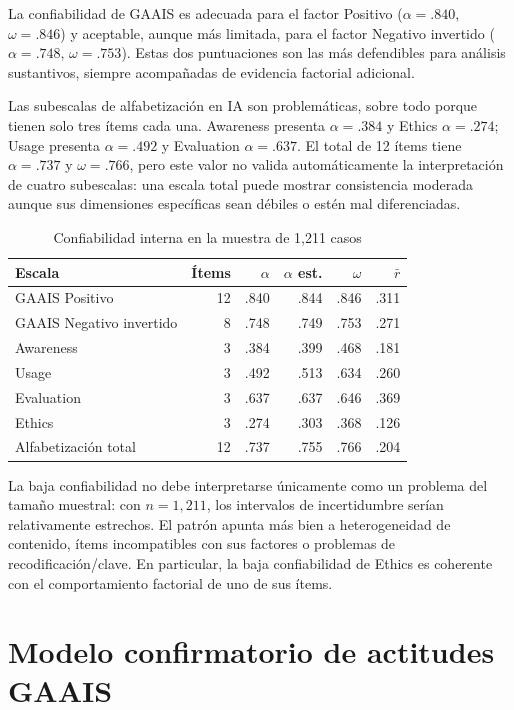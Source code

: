 \documentclass[11pt,a4paper]{article}
\begin{document}
La confiabilidad de GAAIS es adecuada para el factor Positivo ($\alpha=.840$, $\omega=.846$) y aceptable, aunque más limitada, para el factor Negativo invertido ($\alpha=.748$, $\omega=.753$). Estas dos puntuaciones son las más defendibles para análisis sustantivos, siempre acompañadas de evidencia factorial adicional.

Las subescalas de alfabetización en IA son problemáticas, sobre todo porque tienen solo tres ítems cada una. Awareness presenta $\alpha=.384$ y Ethics $\alpha=.274$; Usage presenta $\alpha=.492$ y Evaluation $\alpha=.637$. El total de 12 ítems tiene $\alpha=.737$ y $\omega=.766$, pero este valor no valida automáticamente la interpretación de cuatro subescalas: una escala total puede mostrar consistencia moderada aunque sus dimensiones específicas sean débiles o estén mal diferenciadas.

\begin{table}[ht]
\centering
\caption{Confiabilidad interna en la muestra de 1,211 casos}
\begin{tabular}{lrrrrr}
\toprule
Escala & Ítems & $\alpha$ & $\alpha$ est. & $\omega$ & $\bar{r}$ \\
\midrule
GAAIS Positivo & 12 & .840 & .844 & .846 & .311 \\
GAAIS Negativo invertido & 8 & .748 & .749 & .753 & .271 \\
Awareness & 3 & .384 & .399 & .468 & .181 \\
Usage & 3 & .492 & .513 & .634 & .260 \\
Evaluation & 3 & .637 & .637 & .646 & .369 \\
Ethics & 3 & .274 & .303 & .368 & .126 \\
Alfabetización total & 12 & .737 & .755 & .766 & .204 \\
\bottomrule
\end{tabular}
\end{table}

La baja confiabilidad no debe interpretarse únicamente como un problema del tamaño muestral: con $n=1,211$, los intervalos de incertidumbre serían relativamente estrechos. El patrón apunta más bien a heterogeneidad de contenido, ítems incompatibles con sus factores o problemas de recodificación/clave. En particular, la baja confiabilidad de Ethics es coherente con el comportamiento factorial de uno de sus ítems.

\section{Modelo confirmatorio de actitudes GAAIS}
\end{document}
